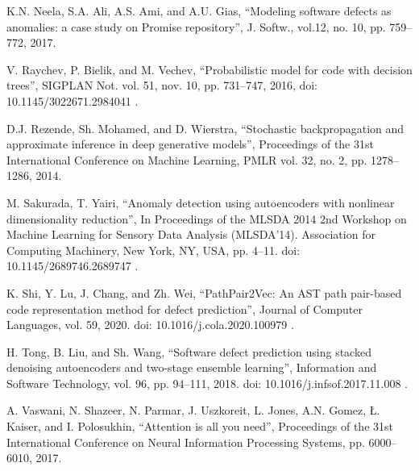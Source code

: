 \documentclass[conference]{ieeetran}
\begin{document}
\begin{thebibliography}{00}
 K.N. Neela, S.A. Ali, A.S. Ami, and A.U. Gias,
 ``Modeling software defects as anomalies: a case study on Promise repository'',
 J. Softw., vol.12, no. 10, pp. 759--772, 2017.

V. Raychev, P. Bielik, and M. Vechev,
 ``Probabilistic model for code with decision trees'',
 SIGPLAN Not. vol. 51, nov. 10, pp. 731--747, 2016, doi: 10.1145/3022671.2984041 .

 D.J. Rezende, Sh. Mohamed, and D. Wierstra,
 ``Stochastic backpropagation and approximate inference in deep generative models'',
  Proceedings of the 31st International Conference on Machine Learning, PMLR vol. 32, no. 2, pp. 1278--1286, 2014. 

 M. Sakurada, T. Yairi,
 ``Anomaly detection using autoencoders with nonlinear dimensionality reduction'',
 In Proceedings of the MLSDA 2014 2nd Workshop on Machine Learning for Sensory Data Analysis (MLSDA'14).
 Association for Computing Machinery, New York, NY, USA, pp. 4--11. doi: 10.1145/2689746.2689747 .

 K. Shi, Y. Lu, J. Chang, and Zh. Wei,
 ``PathPair2Vec: An AST path pair-based code representation method for defect prediction'',
 Journal of Computer Languages, vol. 59, 2020. doi: 10.1016/j.cola.2020.100979 .

 H. Tong, B. Liu, and Sh. Wang,
 ``Software defect prediction using stacked denoising autoencoders and two-stage ensemble learning'',
 Information and Software Technology, vol. 96, pp. 94--111, 2018. doi: 10.1016/j.infsof.2017.11.008 .

 A. Vaswani, N. Shazeer, N. Parmar, J. Uszkoreit, L. Jones, A.N. Gomez, \L. Kaiser, and I. Polosukhin,
 ``Attention is all you need'',
 Proceedings of the 31st International Conference on Neural Information Processing Systems, pp. 6000--6010, 2017.

\end{thebibliography}
\end{document}
